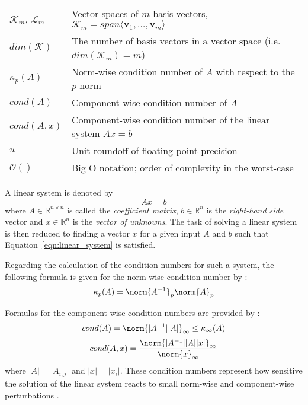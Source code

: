 \begin{tabular}{ll}
  $\mathcal{K}_m$, $\mathcal{L}_m$ & Vector spaces of $m$ basis vectors,  $\mathcal{K}_m=span\langle \bm{v}_1, \dots, \bm{v}_{m} \rangle$ \\
  $dim(\mathcal{K})$ & The number of basis vectors in a vector space (i.e. $dim(\mathcal{K}_m)=m$) \\
  $\kappa_{p}(A)$ & Norm-wise condition number of $A$ with respect to the $p$-norm \\
  $cond(A)$ & Component-wise condition number of $A$ \\
  $cond(A, x)$ & Component-wise condition number of the linear system $Ax=b$ \\
  $u$      & Unit roundoff of floating-point precision \\
  $\mathcal{O}()$ & Big O notation; order of complexity in the worst-case\\

\end{tabular}
\vspace{0.5cm}

\noindent A linear system is denoted by
\begin{equation}
\label{eqn:linear_system}
    Ax=b
\end{equation}
\noindent where $A \in \mathbb{R}^{n \times n}$ is called the \textit{coefficient matrix}, $b \in \mathbb{R}^{n}$ is the \textit{right-hand side} vector and $x \in \mathbb{R}^{n}$ is the \textit{vector of unknowns}. The task of solving a linear system is then reduced to finding a vector $x$ for a given input $A$ and $b$ such that Equation~\hyperref[eqn:linear_system]{\ref{eqn:linear_system}} is satisfied.

\noindent Regarding the calculation of the condition numbers for such a system, the following formula is given for the norm-wise condition number by \cite{higham_accuracy_2002}:
\begin{equation}
\kappa_{p}(A) = \norm{A^{-1}}_p\norm{A}_p
\end{equation}

\noindent Formulas for the component-wise condition numbers are provided by \cite{skeel_scaling_1979}:
\begin{equation}
cond(A) = \norm{|A^{-1}||A|}_\infty \leq \kappa_{\infty}(A)
\end{equation}
\begin{equation}
cond(A,x) = \frac{\norm{|A^{-1}||A||x|}_\infty}{\norm{x}_\infty}
\end{equation}
\noindent where $|A| = |A_{i,j}|$ and $|x| = |x_{i}|$. These condition numbers represent how sensitive the solution of the linear system reacts to small norm-wise and component-wise perturbations \cite{higham_accuracy_2002}. 